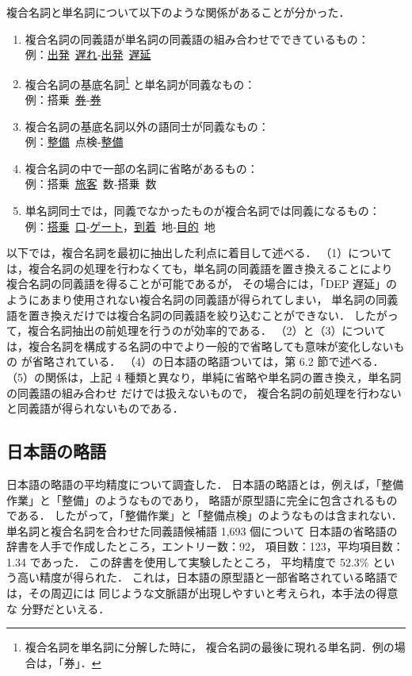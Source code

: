 \documentclass[japanese]{jnlp_1.4}
\begin{document}
複合名詞と単名詞について以下のような関係があることが分かった．
\begin{enumerate}
\item 複合名詞の同義語が単名詞の同義語の組み合わせでできているもの：\\
例：\ul{出発}~\ul{遅れ}‐\ul{出発}~\ul{遅延}
\item 複合名詞の基底名詞\footnote{
	複合名詞を単名詞に分解した時に，
	複合名詞の最後に現れる単名詞．例の場合は，「券」．
} と単名詞が同義なもの：\\
例：搭乗~\ul{券}‐\ul{券}
\item 複合名詞の基底名詞以外の語同士が同義なもの：\\
例：\ul{整備}~点検‐\ul{整備}
\item 複合名詞の中で一部の名詞に省略があるもの：\\
例：搭乗~\ul{旅客}~数‐搭乗~数
\item 単名詞同士では，同義でなかったものが複合名詞では同義になるもの：\\
例：\ul{搭乗}~\ul{口}‐\ul{ゲート}，\ul{到着}~地‐\ul{目的}~地\\
\end{enumerate}

以下では，複合名詞を最初に抽出した利点に着目して述べる．
（1）については，複合名詞の処理を行わなくても，単名詞の同義語を置き換えることにより
複合名詞の同義語を得ることが可能であるが，
その場合には，「DEP 遅延」のようにあまり使用されない複合名詞の同義語が得られてしまい，
単名詞の同義語を置き換えだけでは複合名詞の同義語を絞り込むことができない．
したがって，複合名詞抽出の前処理を行うのが効率的である．
（2）と（3）については，複合名詞を構成する名詞の中でより一般的で省略しても意味が変化しないもの
が省略されている．
（4）の日本語の略語ついては，第 6.2 節で述べる．
（5）の関係は，上記 4 種類と異なり，単純に省略や単名詞の置き換え，単名詞の同義語の組み合わせ
だけでは扱えないもので，
複合名詞の前処理を行わないと同義語が得られないものである．


\subsection{日本語の略語}
\label{subsec:日本語の略語}

日本語の略語の平均精度について調査した．
日本語の略語とは，例えば，「整備作業」と「整備」のようなものであり，
略語が原型語に完全に包含されるものである．
したがって，「整備作業」と「整備点検」のようなものは含まれない．
単名詞と複合名詞を合わせた同義語候補語 1,693 個について
日本語の省略語の辞書を人手で作成したところ，エントリー数：92，
項目数：123，平均項目数：1.34 であった．
この辞書を使用して実験したところ，
平均精度で 52.3\% という高い精度が得られた．
これは，日本語の原型語と一部省略されている略語では，その周辺には
同じような文脈語が出現しやすいと考えられ，本手法の得意な
分野だといえる．
\end{document}
